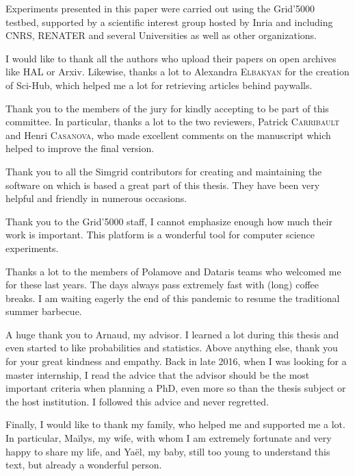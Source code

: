 

Experiments presented in this paper were carried out using the \mbox{Grid'5000}
testbed, supported by a scientific interest group hosted by \mbox{Inria} and including
\mbox{CNRS}, \mbox{RENATER} and several Universities as well as other organizations.

I would like to thank all the authors who upload their papers on open archives like HAL or Arxiv. Likewise, thanks a lot
to Alexandra \textsc{Elbakyan} for the creation of Sci-Hub, which helped me a lot for retrieving articles behind
paywalls.

Thank you to the members of the jury for kindly accepting to be part of this committee. In particular, thanks a lot to
the two reviewers, Patrick \textsc{Carribault} and Henri \textsc{Casanova}, who made excellent comments on the
manuscript which helped to improve the final version.

Thank you to all the Simgrid contributors for creating and maintaining the software on which is based a great part of
this thesis. They have been very helpful and friendly in numerous occasions.

Thank you to the Grid'5000 staff, I cannot emphasize enough how much their work is important. This platform is a
wonderful tool for computer science experiments.

Thanks a lot to the members of Polamove and Dataris teams who welcomed me for these last years. The days always pass
extremely fast with (long) coffee breaks. I am waiting eagerly the end of this pandemic to resume the traditional summer
barbecue.

A huge thank you to Arnaud, my advisor. I learned a lot during this thesis and even started to like probabilities
and statistics. Above anything else, thank you for your great kindness and empathy.  Back in late 2016, when I was
looking for a master internship, I read the advice that the advisor should be the most important criteria when planning
a PhD, even more so than the thesis subject or the host institution. I followed this advice and never regretted.

Finally, I would like to thank my family, who helped me and supported me a lot. In particular, Maïlys, my wife, with
whom I am extremely fortunate and very happy to share my life, and Yaël, my baby, still too young to understand this
text, but already a wonderful person.
